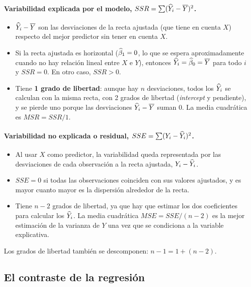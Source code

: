 \paragraph{Variabilidad explicada por el modelo, $SSR=\sum(\widehat{Y}_i-\overline{Y})^2$.}
\begin{itemize}
  \item $\widehat{Y}_i-\overline{Y}$ son las desviaciones de la recta ajustada (que tiene en cuenta $X$)
    respecto del mejor predictor sin tener en cuenta $X$.
  \item Si la recta ajustada es horizontal ($\widehat{\beta}_1=0$, lo que se espera
    aproximadamente cuando no hay relación lineal entre $X$ e $Y$), entonces
    $\widehat{Y}_i=\widehat{\beta}_0=\overline{Y}$ para todo $i$ y $SSR=0$. En otro caso, $SSR>0$.
  \item Tiene \textbf{1 grado de libertad}: aunque hay $n$ desviaciones, todos los $\widehat{Y}_i$ se
    calculan con la misma recta, con 2 grados de libertad (\emph{intercept} y pendiente), y se pierde
    uno porque las desviaciones $\widehat{Y}_i-\overline{Y}$ suman 0. La media cuadrática es $MSR=SSR/1$.
\end{itemize}

\paragraph{Variabilidad no explicada o residual, $SSE=\sum(Y_i-\widehat{Y}_i)^2$.}
\begin{itemize}
  \item Al usar $X$ como predictor, la variabilidad queda representada por las desviaciones de
    cada observación a la recta ajustada, $Y_i-\widehat{Y}_i$.
  \item $SSE=0$ si todas las observaciones coinciden con sus valores ajustados, y es mayor
    cuanto mayor es la dispersión alrededor de la recta.
  \item Tiene $n-2$ grados de libertad, ya que hay que estimar los dos coeficientes para calcular
    los $\widehat{Y}_i$. La media cuadrática $MSE=SSE/(n-2)$ es la mejor estimación de la varianza de
    $Y$ una vez que se condiciona a la variable explicativa.
\end{itemize}
Los grados de libertad también se descomponen: $n-1 = 1 + (n-2)$.

\subsection{El contraste de la regresión}

